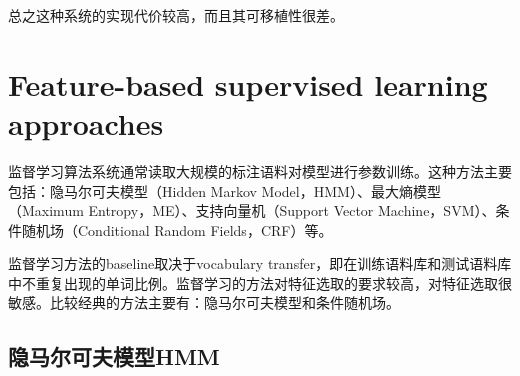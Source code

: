 \documentclass[a4paper,UTF8,no-math]{ctexart}
\begin{document}
	    
	
%	
	
	总之这种系统的实现代价较高，而且其可移植性很差。
	
	
%	
%	
%	
%	
	
	
	\section{Feature-based supervised learning approaches}
	
	监督学习算法系统通常读取大规模的标注语料对模型进行参数训练。这种方法主要包括：隐马尔可夫模型（Hidden Markov Model，HMM）、最大熵模型（Maximum Entropy，ME）、支持向量机（Support Vector Machine，SVM）、条件随机场（Conditional Random Fields，CRF）等。
	
	监督学习方法的baseline取决于vocabulary transfer，即在训练语料库和测试语料库中不重复出现的单词比例。监督学习的方法对特征选取的要求较高，对特征选取很敏感。比较经典的方法主要有：隐马尔可夫模型和条件随机场。
	
	\subsection{隐马尔可夫模型HMM}
	
	
	
\end{document}
